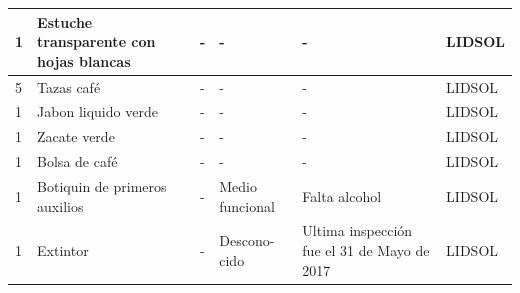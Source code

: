 \documentclass[a4paper,11pt]{article}                 %
\begin{document}
\begin{longtable}{|p{}|p{}|p{}|p{}|p{}|p{}|}
1                          & Estuche transparente con hojas blancas                                                & -                                                                            & -                        & -                                           & LIDSOL                        \\ \hline
5                          & Tazas café                                                                            & -                                                                            & -                        & -                                           & LIDSOL                        \\ \hline
1                          & Jabon liquido verde                                                                   & -                                                                            & -                        & -                                           & LIDSOL                        \\ \hline
1                          & Zacate verde                                                                          & -                                                                            & -                        & -                                           & LIDSOL                        \\ \hline
1                          & Bolsa de café                                                                         & -                                                                            & -                        & -                                           & LIDSOL                        \\ \hline
1                          & Botiquin de primeros auxilios                                                         & -                                                                            & Medio funcional          & Falta alcohol                               & LIDSOL                        \\ \hline
1                          & Extintor                                                                              & -                                                                            & Descono- cido              & Ultima inspección fue el 31 de Mayo de 2017 & LIDSOL                        \\ \hline


\end{longtable}
\end{document}
